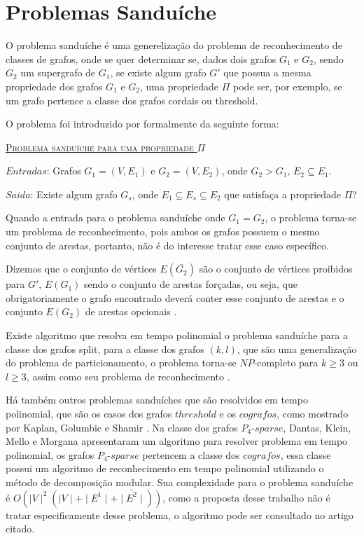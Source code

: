 \section{Problemas Sanduíche}

O problema sanduíche é uma generelização do problema de reconhecimento de classes de grafos, onde se quer determinar se, dados dois grafos $G_1$ e $G_2$, sendo $G_2$ um supergrafo de $G_1$, se existe algum grafo $G'$ que possua a mesma propriedade dos grafos $G_1$ e $G_2$, uma propriedade $\Pi$ pode ser, por exemplo, se um grafo pertence a classe dos grafos cordais ou threshold.  

O problema foi introduzido por \cite{golumbic:95} formalmente da seguinte forma:

\hspace{2.0cm} \underline{\textsc{Problema sanduíche para uma propriedade ${\Pi}$}} 

\hspace{2.0cm} $Entradas$: Grafos $G_1 = (V, E_1)$ e $G_2 = (V, E_2)$, onde $G_2 > G_1$, $E_2 \subseteq E_1$.

\hspace{2.0cm} $Saida$: Existe algum grafo $G_s$, onde $E_1 \subseteq E_s \subseteq E_2$ que satisfaça a propriedade $\Pi$?

Quando a entrada para o problema sanduíche onde $G_1 = G_2$, o problema torna-se um problema de reconhecimento, pois ambos os grafos possuem o mesmo conjunto de arestas, portanto, não é do interesse tratar esse caso específico.

Dizemos que o conjunto de vértices $E(\bar{G_2})$ são o conjunto de vértices proibidos para $G'$, $E(G_1)$ sendo o conjunto de arestas forçadas, ou seja, que obrigatoriamente o grafo encontrado deverá conter esse conjunto de arestas e o conjunto $E(G_2)$ de arestas opcionais \cite{fernandasbpo:2012}.

Existe algoritmo que resolva em tempo polinomial o problema sanduíche para a classe dos grafos split, para a classe dos grafos $(k,l)$, que são uma generalização do problema de particionamento, o problema torna-se $NP$-completo para $k \geq 3$ ou $l \geq 3$, assim como seu problema de reconhecimento \cite{golumbic:95}. 

Há também outros problemas sanduíches que são resolvidos em tempo polinomial, que são os casos dos grafos $threshold$ e os $cografos$, como mostrado por Kaplan, Golumbic e Shamir \cite{golumbic:95}. Na classe dos grafos $P_4$-$sparse$, Dantas, Klein, Mello e Morgana \cite{sulamita2009} apresentaram um algoritmo para resolver problema em tempo polinomial, os grafos $P_4$-$sparse$ pertencem a classe dos $cografos$, essa classe possui um algoritmo de reconhecimento em tempo polinomial utilizando o método de decomposição modular. Sua complexidade para o problema sanduíche é $O(\mid V \mid ^2( \mid V \mid + \mid E^1 \mid + \mid \bar{E^2} \mid ))$, como a proposta desse trabalho não é tratar especificamente desse problema, o algoritmo pode ser consultado no artigo citado. 

